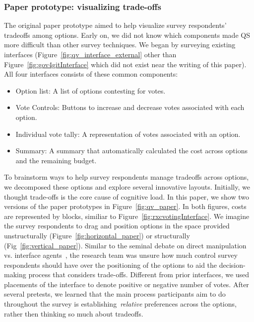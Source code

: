 \subsubsection{Paper prototype: visualizing trade-offs}
The original paper prototype aimed to help visualize survey respondents' tradeoffs among options. Early on, we did not know which components made QS more difficult than other survey techniques. We began by surveying existing interfaces (Figure~\ref{fig:qv_interface_external} other than Figure~\ref{fig:gov4gitInterface} which did not exist near the writing of this paper). All four interfaces consists of these common components:
\begin{itemize}
    \item Option list: A list of options contesting for votes.
    \item Vote Controls: Buttons to increase and decrease votes associated with each option.
    \item Individual vote tally: A representation of votes associated with an option.
    \item Summary: A summary that automatically calculated the cost across options and the remaining budget.
\end{itemize}

To brainstorm ways to help survey respondents manage tradeoffs across options, we decomposed these options and explore several innovative layouts. Initially, we thought trade-offs is the core cause of cognitive load. In this paper, we show two versions of the paper prototypes in Figure~\ref{fig:qv_paper}. In both figures, costs are represented by blocks, similiar to Figure~\ref{fig:rxcvotingInterface}. We imagine the survey respondents to drag and position options in the space provided unstructurally (Figure~\ref{fig:horizontal_paper}) or structurally (Fig~\ref{fig:vertical_paper}). Similar to the seminal debate on direct manipulation vs. interface agents~\cite{shneidermanDirectManipulationVs1997}, the research team was unsure how much control survey respondents should have over the positioning of the options to aid the decision-making process that considers trade-offs. Different from prior interfaces, we used placements of the interface to denote positive or negative number of votes. After several pretests, we learned that the main process participants aim to do throughout the survey is establishing~\textit{relative} preferences across the options, rather then thinking so much about tradeoffs.

